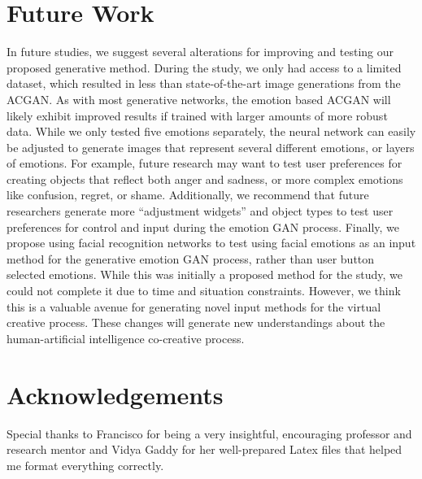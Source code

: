 \documentclass{sigchi}
\begin{document}
\section{Future Work}
In future studies, we suggest several alterations for improving and testing our proposed generative method. During the study, we only had access to a limited dataset, which resulted in less than state-of-the-art image generations from the ACGAN. As with most generative networks, the emotion based ACGAN will likely exhibit improved results if trained with larger amounts of more robust data. While we only tested five emotions separately, the neural network can easily be adjusted to generate images that represent several different emotions, or layers of emotions. For example, future research may want to test user preferences for creating objects that reflect both anger and sadness, or more complex emotions like confusion, regret, or shame. Additionally, we recommend that future researchers generate more “adjustment widgets” and object types to test user preferences for control and input during the emotion GAN process. Finally, we propose using facial recognition networks to test using facial emotions as an input method for the generative emotion GAN process, rather than user button selected emotions. While this was initially a proposed method for the study, we could not complete it due to time and situation constraints. However, we think this is a valuable avenue for generating novel input methods for the virtual creative process. These changes will generate new understandings about the human-artificial intelligence co-creative process.

\section{Acknowledgements}
Special thanks to Francisco for being a very insightful, encouraging professor and research mentor and Vidya Gaddy for her well-prepared Latex files that helped me format everything correctly.

\end{document}
